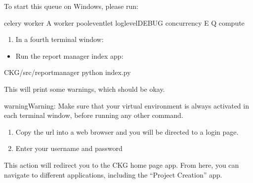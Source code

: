 \documentclass[letterpaper,10pt,english]{sphinxmanual}
\begin{document}
To start this queue on Windows, please run:

\begin{sphinxVerbatim}[commandchars=\\\{\}]
\PYGZgt{} celery worker \PYGZhy{}A worker \PYGZhy{}\PYGZhy{}pooleventlet \PYGZhy{}\PYGZhy{}loglevelDEBUG \PYGZhy{}\PYGZhy{}concurrency \PYGZhy{}E \PYGZhy{}Q compute
\end{sphinxVerbatim}
\begin{enumerate}
%
\setcounter{enumi}{2}
\item {} 
In a fourth terminal window:

\end{enumerate}
\begin{itemize}
\item {} 
Run the report manager index app:

\end{itemize}

\begin{sphinxVerbatim}[commandchars=\\\{\}]
\PYGZdl{}  CKG/src/report\PYGZus{}manager
\PYGZdl{} python index.py
\end{sphinxVerbatim}

This will print some warnings, which should be okay.

\begin{sphinxadmonition}{warning}{Warning:}
Make sure that your virtual environment is always activated in each terminal window, before running any other command.
\end{sphinxadmonition}


\begin{enumerate}
%
\item {} 
Copy the url  into a web browser and you will be directed to a login page.

\item {} 
Enter your username and password

\end{enumerate}

This action will redirect you to the CKG home page app. From here, you can navigate to different applications, including the “Project Creation” app.
\end{document}
